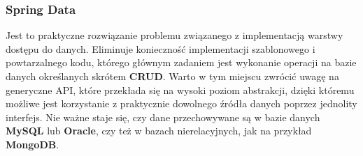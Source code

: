 		\subsubsection{Spring Data}
		\label{app:spring_data}
		Jest to praktyczne rozwiązanie problemu związanego z implementacją warstwy dostępu do danych. Eliminuje konieczność implementacji szablonowego i powtarzalnego kodu, którego głównym zadaniem jest wykonanie operacji na bazie danych określanych skrótem \textbf{CRUD}. Warto w tym miejscu zwrócić uwagę na generyczne API, które przekłada się na wysoki poziom abstrakcji, dzięki któremu możliwe jest korzystanie z praktycznie dowolnego źródła danych poprzez jednolity interfejs. Nie ważne staje się, czy dane przechowywane są w bazie danych \textbf{MySQL} lub \textbf{Oracle}, czy też w bazach nierelacyjnych, jak na przykład \textbf{MongoDB}. 
		
